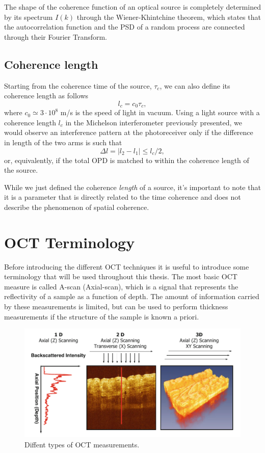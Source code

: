 The shape of the coherence function of an optical source is completely determined by its spectrum $I(k)$ through the Wiener-Khintchine theorem, which states that the autocorrelation function and the \ac{PSD} of a random process are connected through their Fourier Transform. 




\subsection{Coherence length}

Starting from the coherence time of the source, $\tau_c$, we can also define its coherence length as follows
\begin{equation}
	l_c = c_0 \tau_c,
\end{equation}
where $c_0 \simeq 3\cdot10^8$ m/s is the speed of light in vacuum. Using a light source with a coherence length $l_c$ in the Michelson interferometer previously presented, we would observe an interference pattern at the photoreceiver only if the difference in length of the two arms is such that 
\begin{equation}
\Delta l = |l_2 - l_1| \leq l_c / 2,
\end{equation}
or, equivalently, if the total \ac{OPD} is matched to within the coherence length of the source. 


While we just defined the coherence \emph{length} of a source, it's important to note that it is a parameter that is directly related to the time coherence and does not describe the phenomenon of spatial coherence. 

\section{OCT Terminology}
Before introducing the different OCT techniques it is useful to introduce some terminology that will be used throughout this thesis. The most basic OCT measure is called A-scan (Axial-scan), which is a signal that represents the reflectivity of a sample as a function of depth. The amount of information carried by these measurements is limited, but can be used to perform thickness measurements if the structure of the sample is known a priori. 

 \begin{figure}[hbt]
	\myfloatalign
	\includegraphics[width=\linewidth]{gfx/ch2/terminology}
	\caption{Diffent types of OCT measurements. \cite{Drexler2015}}\label{fig:terminology}
\end{figure}

